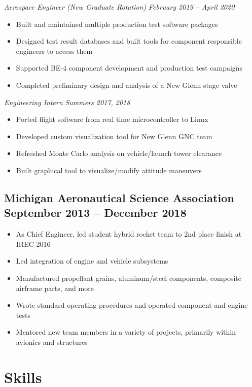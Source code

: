 \documentclass{article}
\begin{document}
\raggedleft\textit{Aerospace Engineer (New Graduate Rotation)} \hfill \textit{February 2019 -- April 2020}
\begin{itemize}
    \item Built and maintained multiple production test software packages
    \item Designed test result databases and built tools for component responsible engineers to access them
    \item Supported BE-4 component development and production test campaigns
    \item Completed preliminary design and analysis of a New Glenn stage valve
\end{itemize}

\raggedleft\textit{Engineering Intern} \hfill \textit{Summers 2017, 2018}
\begin{itemize}
    \item Ported flight software from real time microcontroller to Linux
    \item Developed custom visualization tool for New Glenn GNC team
    \item Refreshed Monte Carlo analysis on vehicle/launch tower clearance
    \item Built graphical tool to visualize/modify attitude maneuvers
\end{itemize}

\bigskip

\subsection{\textbf{Michigan Aeronautical Science Association} \hfill September 2013 -- December 2018}
\begin{itemize}
    \item As Chief Engineer, led student hybrid rocket team to 2nd place finish at IREC 2016
    \item Led integration of engine and vehicle subsystems
    \item Manufactured propellant grains, aluminum/steel components, composite airframe parts, and more
    \item Wrote standard operating procedures and operated component and engine tests
    \item Mentored new team members in a variety of projects, primarily within avionics and structures
\end{itemize}

\bigskip

\section{Skills}
\end{document}
